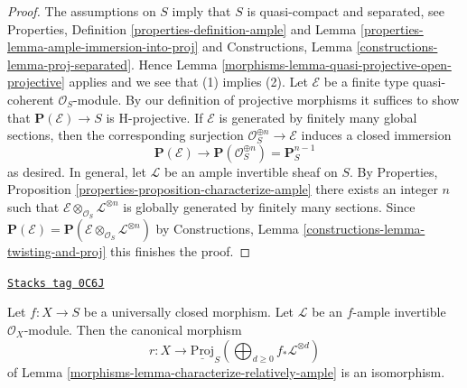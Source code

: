 \begin{proof}

The assumptions on $S$ imply that $S$ is quasi-compact and separated, see
Properties, Definition \ref{properties-definition-ample} and
Lemma \ref{properties-lemma-ample-immersion-into-proj}
and Constructions, Lemma \ref{constructions-lemma-proj-separated}.
Hence Lemma \ref{morphisms-lemma-quasi-projective-open-projective}
applies and we see that (1) implies (2).
Let $\mathcal{E}$ be a finite type quasi-coherent $\mathcal{O}_S$-module.
By our definition of projective morphisms it suffices to show that
$\mathbf{P}(\mathcal{E}) \to S$ is H-projective.
If $\mathcal{E}$ is generated by finitely many global sections,
then the corresponding surjection $\mathcal{O}_S^{\oplus n} \to \mathcal{E}$
induces a closed immersion
$$
\mathbf{P}(\mathcal{E}) \longrightarrow
\mathbf{P}(\mathcal{O}_S^{\oplus n}) = \mathbf{P}^{n - 1}_S
$$
as desired. In general, let $\mathcal{L}$ be an ample invertible sheaf on $S$.
By Properties, Proposition \ref{properties-proposition-characterize-ample}
there exists an integer $n$ such that
$\mathcal{E} \otimes_{\mathcal{O}_S} \mathcal{L}^{\otimes n}$
is globally generated by finitely many sections. Since
$\mathbf{P}(\mathcal{E}) =
\mathbf{P}(\mathcal{E} \otimes_{\mathcal{O}_S} \mathcal{L}^{\otimes n})$ by
Constructions, Lemma \ref{constructions-lemma-twisting-and-proj}
this finishes the proof.
\end{proof}

\begin{lemma}
\label{morphisms-lemma-proper-ample-is-proj}
\href{https://stacks.math.columbia.edu/tag/0C6J}{\texttt{Stacks tag 0C6J}}

Let $f : X \to S$ be a universally closed morphism.
Let $\mathcal{L}$ be an $f$-ample invertible $\mathcal{O}_X$-module.
Then the canonical morphism
$$
r : X
\longrightarrow
\underline{\text{Proj}}_S
\left(
\bigoplus\nolimits_{d \geq 0} f_*\mathcal{L}^{\otimes d}
\right)
$$
of Lemma \ref{morphisms-lemma-characterize-relatively-ample} is an isomorphism.
\end{lemma}

